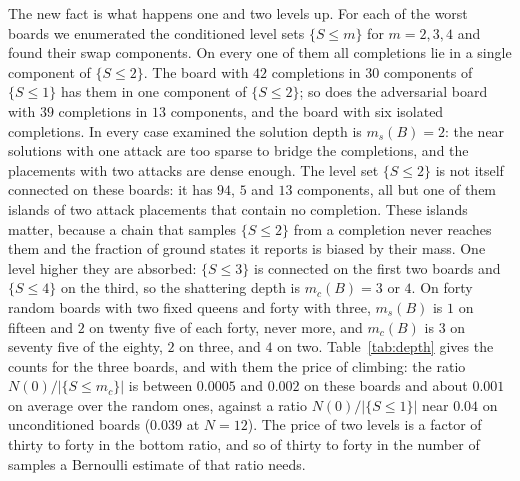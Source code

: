 The new fact is what happens one and two levels up. For each of the worst boards we enumerated the conditioned level sets $\{ S \le m \}$ for $m = 2, 3, 4$ and found their swap components. On every one of them all completions lie in a single component of $\{ S \le 2 \}$. The board with $42$ completions in $30$ components of $\{ S \le 1 \}$ has them in one component of $\{ S \le 2 \}$; so does the adversarial board with $39$ completions in $13$ components, and the board with six isolated completions. In every case examined the solution depth is $m_s(B) = 2$: the near solutions with one attack are too sparse to bridge the completions, and the placements with two attacks are dense enough. The level set $\{ S \le 2 \}$ is not itself connected on these boards: it has $94$, $5$ and $13$ components, all but one of them islands of two attack placements that contain no completion. These islands matter, because a chain that samples $\{ S \le 2 \}$ from a completion never reaches them and the fraction of ground states it reports is biased by their mass. One level higher they are absorbed: $\{ S \le 3 \}$ is connected on the first two boards and $\{ S \le 4 \}$ on the third, so the shattering depth is $m_c(B) = 3$ or $4$. On forty random boards with two fixed queens and forty with three, $m_s(B)$ is $1$ on fifteen and $2$ on twenty five of each forty, never more, and $m_c(B)$ is $3$ on seventy five of the eighty, $2$ on three, and $4$ on two. Table~\ref{tab:depth} gives the counts for the three boards, and with them the price of climbing: the ratio $N(0) / |\{ S \le m_c \}|$ is between $0.0005$ and $0.002$ on these boards and about $0.001$ on average over the random ones, against a ratio $N(0) / |\{ S \le 1 \}|$ near $0.04$ on unconditioned boards ($0.039$ at $N = 12$). The price of two levels is a factor of thirty to forty in the bottom ratio, and so of thirty to forty in the number of samples a Bernoulli estimate of that ratio needs.

